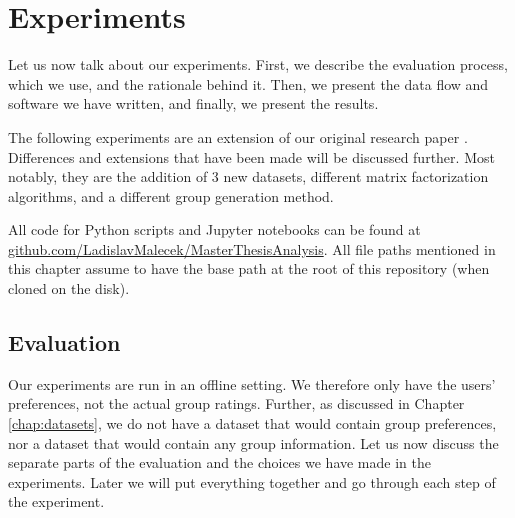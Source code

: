 \chapter{Experiments}  \label{chap:experiments}

Let us now talk about our experiments. First, we describe the evaluation process, which we use, and the rationale behind it. Then, we present the data flow and software we have written, and finally, we present the results.

The following experiments are an extension of our original research paper \cite{our_ep_fuzz_da}. Differences and extensions that have been made will be discussed further. Most notably, they are the addition of 3 new datasets, different matrix factorization algorithms, and a different group generation method.


All code for Python scripts and Jupyter notebooks can be found at \newline\href{https://github.com/LadislavMalecek/MasterThesisAnalysis}{github.com/LadislavMalecek/MasterThesisAnalysis}. All file paths mentioned in this chapter assume to have the base path at the root of this repository (when cloned on the disk).

\section{Evaluation}\label{subsec:experiments.evaluation}

Our experiments are run in an offline setting. We therefore only have the users' preferences, not the actual group ratings. Further, as discussed in Chapter \ref{chap:datasets}, we do not have a dataset that would contain group preferences, nor a dataset that would contain any group information. Let us now discuss the separate parts of the evaluation and the choices we have made in the experiments. Later we will put everything together and go through each step of the experiment.

